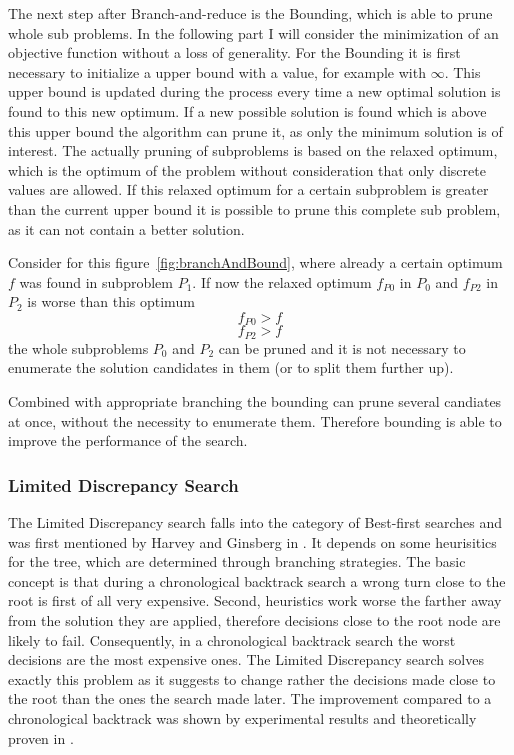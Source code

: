 \documentclass[10pt,
               a4paper,
               journal,
               ]{IEEEtran}
\newcommand{\reffig}[1]{{figure~\ref{#1}}}
\begin{document}
	The next step after Branch-and-reduce is the Bounding, which is able to prune whole sub problems. In the following part I will consider the minimization of an objective function without a loss of generality. For the Bounding it is first necessary to initialize a upper bound with a value, for example with $\infty$. This upper bound is updated during the process every time a new optimal solution is found to this new optimum. If a new possible solution is found which is above this upper bound the algorithm can prune it, as only the minimum solution is of interest. The actually pruning of subproblems is based on the relaxed optimum, which is the optimum of the problem without consideration that only discrete values are allowed. If this relaxed optimum for a certain subproblem is greater than the current upper bound it is possible to prune this complete sub problem, as it can not contain a better solution.
	
	Consider for this \reffig{fig:branchAndBound}, where already a certain optimum $f$ was found in subproblem $P_1$. If now the relaxed optimum $f_{P0}$ in $P_0$ and $f_{P2}$ in $P_2$ is worse than this optimum
	\begin{equation}
		f_{P0} > f
	\end{equation}
	\begin{equation}
		f_{P2} > f
	\end{equation}
	the whole subproblems $P_{0}$ and $P_{2}$ can be pruned and it is not necessary to enumerate the solution candidates in them (or to split them further up).
	
	Combined with appropriate branching the bounding can prune several candiates at once, without the necessity to enumerate them. Therefore bounding is able to improve the performance of the search.
	
	\subsubsection{Limited Discrepancy Search}
	The Limited Discrepancy search falls into the category of Best-first searches and was first mentioned by Harvey and Ginsberg in \cite{limitedDiscrepancy}. It depends on some heurisitics for the tree, which are determined through branching strategies. The basic concept is that during a chronological backtrack search a wrong turn close to the root is first of all very expensive. Second, heuristics work worse the farther away from the solution they are applied, therefore decisions close to the root node are likely to fail. Consequently, in a chronological backtrack search the worst decisions are the most expensive ones. The Limited Discrepancy search solves exactly this problem as it suggests to change rather the decisions made close to the root than the ones the search made later. The improvement compared to a chronological backtrack was shown by experimental results and theoretically proven in \cite{limitedDiscrepancy}.
	
\end{document}
